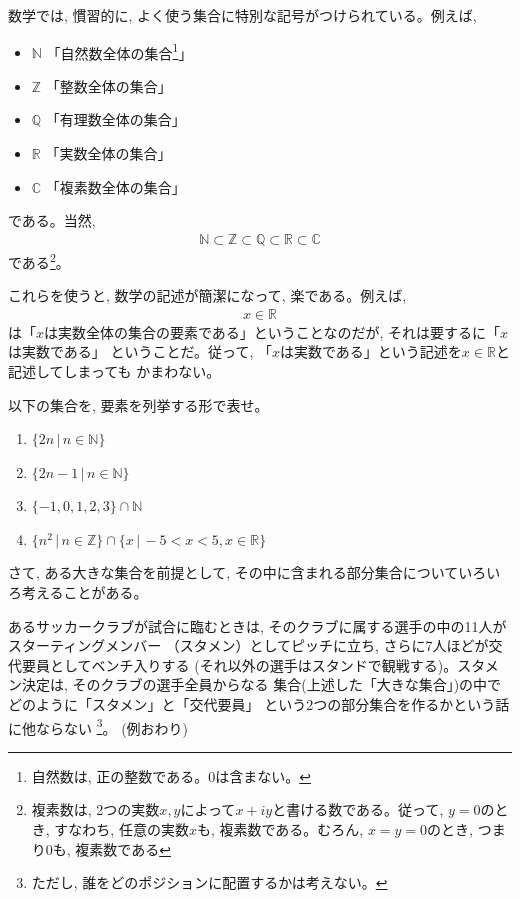 数学では, 慣習的に, よく使う集合に特別な記号がつけられている。例えば, 
\begin{itemize}
\item $\mathbb{N}$ 「自然数全体の集合\footnote{自然数は, 正の整数である。0は含まない。}」
\item $\mathbb{Z}$ 「整数全体の集合」
\item $\mathbb{Q}$ 「有理数全体の集合」
\item $\mathbb{R}$ 「実数全体の集合」
\item $\mathbb{C}$ 「複素数全体の集合」
\end{itemize}
である。当然, 
\begin{eqnarray}
\mathbb{N} \subset \mathbb{Z} \subset \mathbb{Q} \subset \mathbb{R} \subset \mathbb{C}
\end{eqnarray}
である\footnote{複素数は, 2つの実数$x, y$によって$x+iy$と書ける数である。従って, 
$y=0$のとき, すなわち, 任意の実数$x$も, 複素数である。むろん, $x=y=0$のとき, 
つまり$0$も, 複素数である}。


これらを使うと, 数学の記述が簡潔になって, 楽である。例えば, 
\begin{eqnarray*}x\in\mathbb{R}\end{eqnarray*}
は「$x$は実数全体の集合の要素である」ということなのだが, それは要するに「$x$は実数である」
ということだ。従って, 「$x$は実数である」という記述を$x\in\mathbb{R}$と記述してしまっても
かまわない。\\

\begin{q}\label{q:logic_group_elem0}
以下の集合を, 要素を列挙する形で表せ。
\begin{enumerate}
\item $\{2n\,|\,n \in \mathbb{N}\}$
\mv
\item $\{2n-1\,|\,n \in \mathbb{N}\}$
\mv
\item $\{-1, 0, 1, 2, 3\} \cap \mathbb{N}$
\mv
\item $\{n^2\,|\,n\in\mathbb{Z}\} \cap \{x\,|\,-5<x<5, x\in\mathbb{R}\}$
\end{enumerate}
\end{q}
\mv

さて, ある大きな集合を前提として, その中に含まれる部分集合についていろいろ考えることがある。
\begin{exmpl}
あるサッカークラブが試合に臨むときは, そのクラブに属する選手の中の11人がスターティングメンバー
（スタメン）としてピッチに立ち, さらに7人ほどが交代要員としてベンチ入りする
(それ以外の選手はスタンドで観戦する)。スタメン決定は, そのクラブの選手全員からなる
集合(上述した「大きな集合」)の中でどのように「スタメン」と「交代要員」
という2つの部分集合を作るかという話に他ならない
\footnote{ただし, 誰をどのポジションに配置するかは考えない。}。
(例おわり)\end{exmpl}
\mv

